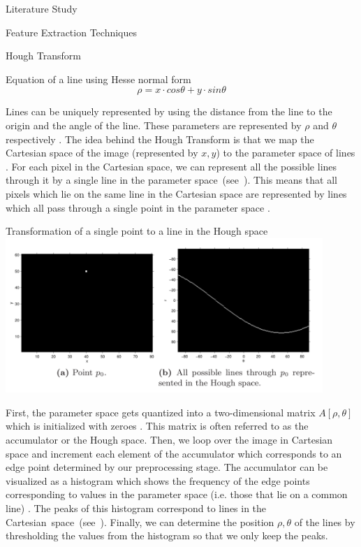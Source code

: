 \documentclass{matthijs}
\begin{document}
\begin{hoofdstuk}{Literature Study}
\begin{paragraaf}{Feature Extraction Techniques}
\begin{subparagraaf}{Hough Transform}
				\begin{figuur}{Equation of a line using Hesse normal form}
					\begin{equation*}
						\rho = x \cdot cos \theta + y \cdot sin \theta
					\end{equation*}\cite{caltech2009line}
				\end{figuur}

				Lines can be uniquely represented by using the distance from the line to the origin and the angle of the line.
				These parameters are represented by $\rho$ and $\theta$ respectively \cite{caltech2009line}.
				The idea behind the Hough Transform is that we map the Cartesian space of the image (represented by $x,y$) to the parameter space of lines \cite{solberg2009hough}.
				For each pixel in the Cartesian space, we can represent all the possible lines through it by a single line in the parameter \mbox{space (see ).}
				This means that all pixels which lie on the same line in the Cartesian space are represented by lines which all pass through a single point in the parameter space \cite{kahl2000hough}.

				\begin{figuur}{Transformation of a single point to a line in the Hough space}
					\includegraphics[width=0.9\textwidth]{caltech2009line-img1.png}
					\cite{caltech2009line}
				\end{figuur}

				\bigskip

				First, the parameter space gets quantized into a two-dimensional matrix $ A[\rho,\theta] $ which is initialized with zeroes \cite{solberg2009hough}.
				This matrix is often referred to as the accumulator or the Hough space.
				Then, we loop over the image in Cartesian space and increment each element of the accumulator which corresponds to an edge point determined by our preprocessing stage.
				The accumulator can be visualized as a histogram which shows the frequency of the edge points corresponding to values in the parameter space (i.e. those that lie on a common line) \cite{kahl2000hough}.
				The peaks of this histogram correspond to lines in the \mbox{Cartesian space (see ).}
				Finally, we can determine the position $\rho,\theta$ of the lines by thresholding the values from the histogram so that we only keep the peaks.


\end{subparagraaf}
\end{paragraaf}
\end{hoofdstuk}
\end{document}
